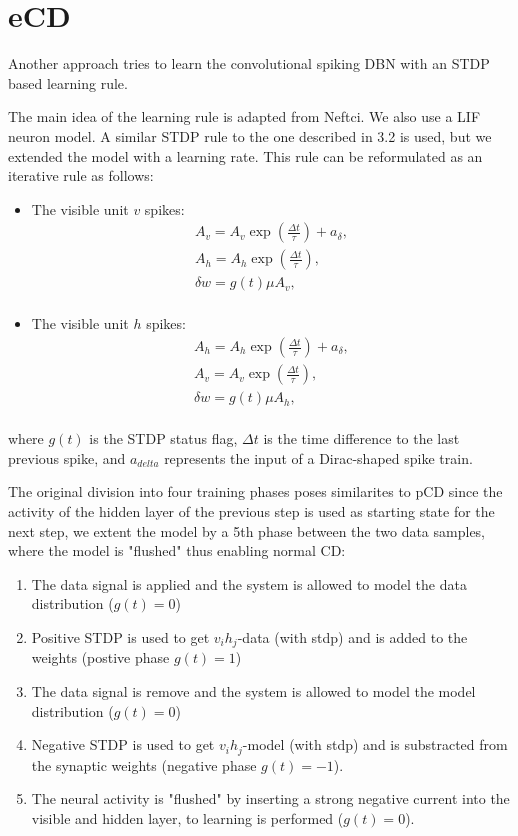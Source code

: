 \section{eCD}

Another approach tries to learn the convolutional spiking DBN with an STDP based learning rule. 

The main idea of the learning rule is adapted from Neftci.
We also use a LIF neuron model.
A similar STDP rule to the one described in 3.2 is used, but we extended the model with a learning rate. 
This rule can be reformulated as an iterative rule as follows:
\begin{itemize}
\item The visible unit $v$ spikes: 
\[
\begin{split}
A_v = A_v \exp(\frac{\Delta t}{\tau}) + a_{\delta} ,\\
A_h = A_h \exp(\frac{\Delta t}{\tau}) ,\\
\delta w = g(t) \mu A_v  ,\\
\end{split}
\]
\item The visible unit $h$ spikes: 
\[
\begin{split}
A_h = A_h \exp(\frac{\Delta t}{\tau}) + a_{\delta} ,\\
A_v = A_v \exp(\frac{\Delta t}{\tau}) ,\\
\delta w = g(t) \mu A_h  ,\\
\end{split}
\]
\end{itemize}
where $g(t)$ is the STDP status flag, $\Delta t$ is the time difference to the last previous spike, and $a_{delta}$ represents the input of a Dirac-shaped spike train.


The original division into four training phases poses similarites to pCD since the activity of the hidden layer of the previous step is used as starting state for the next step, we extent the model by a 5th phase between the two data samples, where the model is "flushed" thus enabling normal CD:

\begin{enumerate}
\item The data signal is applied and the system is allowed to model the data distribution ($g(t)=0$)
\item Positive STDP is used to get $v_i h_j$-data (with stdp) and is added to the weights (postive phase $g(t)=1$)
\item The data signal is remove and the system is allowed to model the model distribution ($g(t)=0$)
\item Negative STDP is used to get $v_i h_j$-model (with stdp) and is substracted from the synaptic weights (negative phase $g(t)=-1$).
\item The neural activity is "flushed" by inserting a strong negative current into the visible and hidden layer, to learning is performed ($g(t)=0$).
\end{enumerate}


